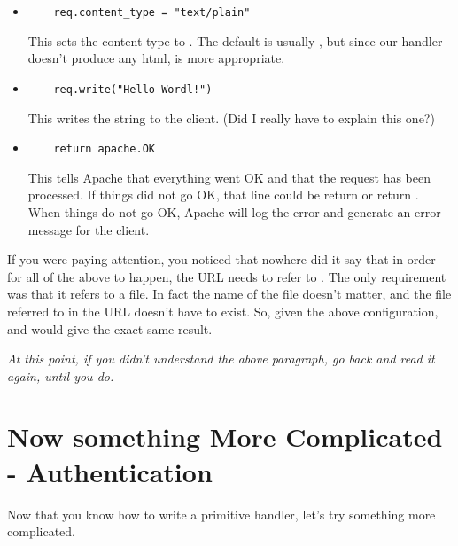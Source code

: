 \begin{enumerate}
\begin{itemize}
\item
\begin{verbatim}
    req.content_type = "text/plain"
\end{verbatim}

This sets the content type to . The default is usually
, but since our handler doesn't produce any html,
 is more appropriate.

\item
\begin{verbatim}
    req.write("Hello Wordl!")
\end{verbatim}

This writes the  string to the client. (Did I really
have to explain this one?)

\item
\begin{verbatim}
    return apache.OK
\end{verbatim}

This tells Apache that everything went OK and that the request has
been processed. If things did not go OK, that line could be return
 or return
. When things do not go OK, Apache
will log the error and generate an error message for the client.
\end{itemize}
\end{enumerate}

 If you were paying attention, you noticed that
nowhere did it say that in order for all of the above to happen, the
URL needs to refer to . The only requirement was
that it refers to a  file. In fact the name of the file doesn't
matter, and the file referred to in the URL doesn't have to exist. So,
given the above configuration,
 and
 would give the exact same
result.

 \emph{At this point, if you didn't understand the above paragraph, go back and read it again, until you do.}

\section{Now something More Complicated - Authentication\label{tut-more-complicated}}

Now that you know how to write a primitive handler, let's try
something more complicated.

